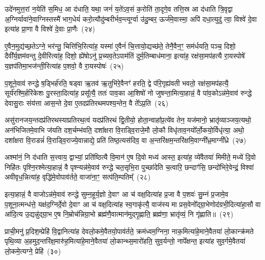 उदे॑नमुत्त॒रां न॒येति॑ स॒मिध॒ आ द॑धाति॒ यथा॒ जनं॑ य॒ते॑\-ऽव॒सं क॒रोति॑ ता॒दृगे॒व तत्ति॒स्र आ द॑धाति त्रि॒वृद्वा अ॒ग्निर्यावा॑ने॒वाग्निस्तस्मै॑ भाग॒धेयं॑ करो॒त्यौदु॑म्बरीर्भव॒न्त्यूर्ग्वा उ॑दु॒म्बर॒ ऊर्ज॑मे॒वास्मा॒ अपि॑ दधा॒त्युदु॑ त्वा॒ विश्वे॑ दे॒वा इत्या॑ह प्रा॒णा वै विश्वे॑ दे॒वाः प्रा॒णैः~(२४)

ए॒वैन॒मुद्य॑च्छ॒ते\-ऽग्ने॒ भर॑न्तु॒ चित्ति॑भि॒रित्या॑ह॒ यस्मा॑ ए॒वैनं॑ चि॒त्तायो॒द्यच्छ॑ते॒ तेनै॒वैन॒ꣳ॒ सम॑र्धयति॒ पञ्च॒ दिशो॒ दैवी᳚र्य॒ज्ञम॑वन्तु दे॒वीरित्या॑ह॒ दिशो॒ ह्ये॑षो\-ऽनु॑ प्र॒च्यव॒ते\-ऽपाम॑तिं दुर्म॒तिम्बाध॑माना॒ इत्या॑ह॒ रक्ष॑सा॒मप॑हत्यै रा॒यस्पोषे॑ य॒ज्ञप॑तिमा॒भज॑न्ती॒रित्या॑ह प॒शवो॒ वै रा॒यस्पोषः॑~(२५)

प॒शूने॒वाव॑ रुन्द्धे ष॒ड्भिर्\mbox{}ह॑रति॒ षड्वा ऋ॒तव॑ ऋ॒तुभि॑रे॒वैनꣳ॑ हरति॒ द्वे प॑रि॒गृह्य॑वती भवतो॒ रक्ष॑सा॒मप॑हत्यै॒ सूर्य॑रश्मि॒र्\mbox{}हरि॑केशः पु॒रस्ता॒दित्या॑ह॒ प्रसू᳚त्यै॒ ततः॑ पाव॒का आ॒शिषो॑ नो जुषन्ता॒मित्या॒हान्नं॒ वै पा॑व॒को\-ऽन्न॑मे॒वाव॑ रुन्द्धे देवासु॒राः संय॑त्ता आस॒न्ते दे॒वा ए॒तदप्र॑तिरथमपश्य॒न्तेन॒ वै ते᳚\-ऽप्र॒ति~(२६)

असु॑रानजय॒न्तदप्र॑तिरथस्याप्रतिरथ॒त्वं यदप्र॑तिरथं द्वि॒तीयो॒ होता॒न्वाहा᳚प्र॒त्ये॑व तेन॒ यज॑मानो॒ भ्रातृ॑व्याञ्जय॒त्यथो॒ अन॑भिजितमे॒वाभि ज॑यति दश॒र्चम्भ॑वति॒ दशा᳚क्षरा वि॒राड्वि॒राजे॒मौ लो॒कौ विधृ॑ताव॒नयो᳚र्लो॒कयो॒र्विधृ॑त्या॒ अथो॒ दशा᳚क्षरा वि॒राडन्नं॑ वि॒राड्वि॒राज्ये॒वान्नाद्ये॒ प्रति॑ तिष्ठ॒त्यस॑दिव॒ वा अ॒न्तरि॑क्षम॒न्तरि॑क्षमि॒वाग्नी᳚ध्र॒माग्नी᳚ध्रे~(२७)

अश्मा॑नं॒ नि द॑धाति स॒त्त्वाय॒ द्वाभ्यां॒ प्रति॑ष्ठित्यै वि॒मान॑ ए॒ष दि॒वो मध्य॑ आस्त॒ इत्या॑ह॒ व्ये॑वैतया॑ मिमीते॒ मध्ये॑ दि॒वो निहि॑तः पृश्नि॒रश्मेत्या॒हान्नं॒ वै पृश्न्यन्न॑मे॒वाव॑ रुन्द्धे चत॒सृभि॒रा पुच्छा॑देति च॒त्वारि॒ छन्दाꣳ॑सि॒ छन्दो॑भिरे॒वेन्द्रं॒ विश्वा॑ अवीवृध॒न्नित्या॑ह॒ वृद्धि॑मे॒वोपाव॑र्तते॒ वाजा॑ना॒ꣳ॒ सत्प॑ति॒म्पतिम्᳚~(२८)

इत्या॒हान्नं॒ वै वाजो\-ऽन्न॑मे॒वाव॑ रुन्द्धे सुम्न॒हूर्य॒ज्ञो दे॒वाꣳ आ च॑ वक्ष॒दित्या॑ह प्र॒जा वै प॒शवः॑ सु॒म्नं प्र॒जामे॒व प॒शूना॒त्मन्ध॑त्ते॒ यक्ष॑द॒ग्निर्दे॒वो दे॒वाꣳ आ च॑ वक्ष॒दित्या॑ह स्व॒गाकृ॑त्यै॒ वाज॑स्य मा प्रस॒वेनो᳚द्ग्रा॒भेणोद॑ग्रभी॒दित्या॑हा॒सौ वा आ॑दि॒त्य उ॒द्यन्नु॑द्ग्रा॒भ ए॒ष नि॒म्रोच॑न्निग्रा॒भो ब्रह्म॑णै॒वात्मान॑मुद्गृ॒ह्णाति॒ ब्रह्म॑णा॒ भ्रातृ॑व्यं॒ नि गृ॑ह्णाति॥~(२९)

{\anuvakamend[{प्रा॒णैः पोषो᳚\-ऽप्र॒त्याग्नी᳚ध्रे॒ पति॑मे॒ष दश॑ च}]}%

प्राची॒मनु॑ प्र॒दिश॒म्प्रेहि॑ वि॒द्वानित्या॑ह देवलो॒कमे॒वैतयो॒पाव॑र्तते॒ क्रम॑ध्वम॒ग्निना॒ नाक॒मित्या॑हे॒माने॒वैतया॑ लो॒कान्क्र॑मते पृथि॒व्या अ॒हमुद॒न्तरि॑क्ष॒मारु॑ह॒मित्या॑हे॒माने॒वैतया॑ लो॒कान्थ्स॒मारो॑हति॒ सुव॒र्यन्तो॒ नापे᳚क्षन्त॒ इत्या॑ह सुव॒र्गमे॒वैतया॑ लो॒कमे॒त्यग्ने॒ प्रेहि॑~(३०)

